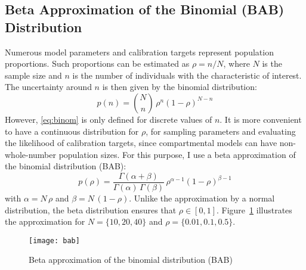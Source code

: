 \subsection{Beta Approximation of the Binomial (BAB) Distribution}\label{app.model.math.bab}
Numerous model parameters and calibration targets represent population proportions.
Such proportions can be estimated as $\rho = n / N$, where
$N$ is the sample size and $n$ is the number of individuals with the characteristic of interest.
The uncertainty around $n$ is then given by the binomial distribution:
\begin{equation}\label{eq:binom}
  p(n) = {N \choose n} \, \rho^{n}{(1 - \rho)}^{N - n}
\end{equation}
However, \eqref{eq:binom} is only defined for discrete values of $n$.
It is more convenient to have a continuous distribution for $\rho$,
for sampling parameters and evaluating the likelihood of calibration targets,
since compartmental models can have non-whole-number population sizes.
For this purpose, I use a beta approximation of the binomial distribution (BAB):
\begin{equation}\label{eq:beta}
  p(\rho) =
    \frac{\Gamma(\alpha+\beta)}{\Gamma(\alpha)\,\Gamma(\beta)}\,
    \rho^{\alpha-1}{(1 - \rho)}^{\beta-1}
\end{equation}
with $\alpha = N\,\rho$ and $\beta = N\,(1-\rho)$.
Unlike the approximation by a normal distribution,
the beta distribution ensures that $\rho \in [0,1]$.
Figure~\ref{fig:bab} illustrates the approximation for
$N = \{10,20,40\}$ and $\rho = \{0.01,0.1,0.5\}$.
\begin{figure}
  \centering
  \texttt{[image: bab]}
  \caption{Beta approximation of the binomial distribution (BAB)}
  \label{fig:bab}
\end{figure}
